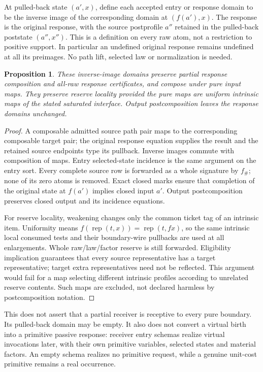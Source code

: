 \documentclass[11pt]{article}
\newtheorem{proposition}{Proposition}
\begin{document}
At pulled-back state $(a',x)$, define each accepted entry or response domain to be the inverse image of the corresponding domain at $(f(a'),x)$. The response is the original response, with the source postprofile $a''$ retained in the pulled-back poststate $(a'',x'')$. This is a definition on every raw atom, not a restriction to positive support. In particular an undefined original response remains undefined at all its preimages. No path lift, selected law or normalization is needed.

\begin{proposition}
These inverse-image domains preserve partial response composition and all-raw response certificates, and compose under pure input maps. They preserve reserve locality provided the pure maps are uniform intrinsic maps of the stated saturated interface. Output postcomposition leaves the response domains unchanged.
\end{proposition}
\begin{proof}
A composable admitted source path pair maps to the corresponding composable target pair; the original response equation supplies the result and the retained source endpoints type its pullback. Inverse images commute with composition of maps. Entry selected-state incidence is the same argument on the entry sort. Every complete source row is forwarded as a whole signature by $f_\#$; none of its zero atoms is removed. Exact closed marks ensure that completion of the original state at $f(a')$ implies closed input $a'$. Output postcomposition preserves closed output and its incidence equations.

For reserve locality, weakening changes only the common ticket tag of an intrinsic item. Uniformity means $f(\operatorname{rep}(t,x))=\operatorname{rep}(t,fx)$, so the same intrinsic local consumed tests and their boundary-wire pullbacks are used at all enlargements. Whole raw/law/factor reserve is still forwarded. Eligibility implication guarantees that every source representative has a target representative; target extra representatives need not be reflected. This argument would fail for a map selecting different intrinsic profiles according to unrelated reserve contents. Such maps are excluded, not declared harmless by postcomposition notation.\end{proof}

This does not assert that a partial receiver is receptive to every pure boundary. Its pulled-back domain may be empty. It also does not convert a virtual birth into a primitive passive response: receiver entry schemas realize virtual invocations later, with their own primitive variables, selected states and material factors. An empty schema realizes no primitive request, while a genuine unit-cost primitive remains a real occurrence.
\end{document}
